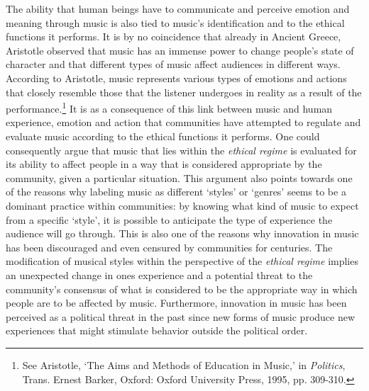 The ability that human beings have to communicate and perceive emotion and meaning through music is also tied to music's identification and to the ethical functions it performs. It is by no coincidence that already in Ancient Greece, Aristotle observed that music has an immense power to change people's state of character and that different types of music affect audiences in different ways. According to Aristotle, music represents various types of emotions and actions that closely resemble those that the listener undergoes in reality as a result of the performance.\footnote{See Aristotle, `The Aims and Methods of Education in Music,' in \emph{Politics}, Trans. Ernest Barker, Oxford: Oxford University Press, 1995, pp. 309-310.} It is as a consequence of this link between music and human experience, emotion and action that communities have attempted to regulate and evaluate music according to the ethical functions it performs. One could consequently argue that music that lies within the \emph{ethical regime} is evaluated for its ability to affect people in a way that is considered appropriate by the community, given a particular situation. This argument also points towards one of the reasons why labeling music as different `styles' or `genres' seems to be a dominant practice within communities: by knowing what kind of music to expect from a specific `style', it is possible to anticipate the type of experience the audience will go through. This is also one of the reasons why innovation in music has been discouraged and even censured by communities for centuries. The modification of musical styles within the perspective of the \emph{ethical regime} implies an unexpected change in ones experience and a potential threat to the community's consensus of what is considered to be the appropriate way in which people are to be affected by music. Furthermore, innovation in music has been perceived as a political threat in the past since new forms of music produce new experiences that might stimulate behavior outside the political order. 

